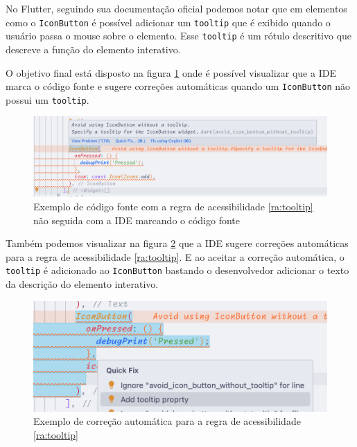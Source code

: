 No Flutter, seguindo sua documentação oficial \cite{flutter} podemos notar que em elementos como o \texttt{IconButton} é possível adicionar um \texttt{tooltip} que é exibido quando o usuário passa o mouse sobre o elemento. Esse \texttt{tooltip} é um rótulo descritivo que descreve a função do elemento interativo.

O objetivo final está disposto na figura \ref{fig:exemplo-codigo-fonte-tooltip} onde é possível visualizar que a IDE marca o código fonte e sugere correções automáticas quando um \texttt{IconButton} não possui um \texttt{tooltip}.

\begin{figure}[!ht]
	\centering
	\caption{Exemplo de código fonte com a regra de acessibilidade \ref{ra:tooltip} não seguida com a IDE marcando o código fonte}\label{fig:exemplo-codigo-fonte-tooltip}
	\includegraphics[width=425pt]{Assets/PrintIDEAviso.png}
\end{figure}

Também podemos visualizar na figura \ref{fig:exemplo-correcao-automatica-tooltip} que a IDE sugere correções automáticas para a regra de acessibilidade \ref{ra:tooltip}. E ao aceitar a correção automática, o \texttt{tooltip} é adicionado ao \texttt{IconButton} bastando o desenvolvedor adicionar o texto da descrição do elemento interativo.

\begin{figure}[!ht]
	\centering
	\caption{Exemplo de correção automática para a regra de acessibilidade \ref{ra:tooltip}}\label{fig:exemplo-correcao-automatica-tooltip}
	\includegraphics[width=425pt]{Assets/PrintIDECorrecao.png}
\end{figure}

